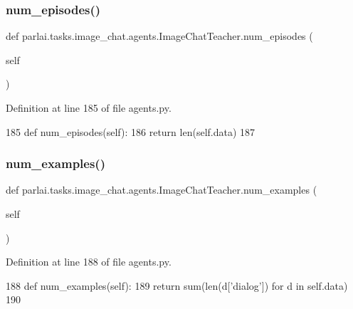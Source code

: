 \subsubsection{\texorpdfstring{num\+\_\+episodes()}{num\_episodes()}}
{\footnotesize\ttfamily def parlai.\+tasks.\+image\+\_\+chat.\+agents.\+Image\+Chat\+Teacher.\+num\+\_\+episodes (\begin{DoxyParamCaption}\item[{}]{self }\end{DoxyParamCaption})}



Definition at line 185 of file agents.\+py.


\begin{DoxyCode}
185     \textcolor{keyword}{def }num\_episodes(self):
186         \textcolor{keywordflow}{return} len(self.data)
187 
\end{DoxyCode}
\mbox{\label{classparlai_1_1tasks_1_1image__chat_1_1agents_1_1ImageChatTeacher_a79f6d03e7d21be3a61bad00252f8ea66}} 
\subsubsection{\texorpdfstring{num\+\_\+examples()}{num\_examples()}}
{\footnotesize\ttfamily def parlai.\+tasks.\+image\+\_\+chat.\+agents.\+Image\+Chat\+Teacher.\+num\+\_\+examples (\begin{DoxyParamCaption}\item[{}]{self }\end{DoxyParamCaption})}



Definition at line 188 of file agents.\+py.


\begin{DoxyCode}
188     \textcolor{keyword}{def }num\_examples(self):
189         \textcolor{keywordflow}{return} sum(len(d[\textcolor{stringliteral}{'dialog'}]) \textcolor{keywordflow}{for} d \textcolor{keywordflow}{in} self.data)
190 
\end{DoxyCode}
\mbox{\label{classparlai_1_1tasks_1_1image__chat_1_1agents_1_1ImageChatTeacher_aa91037220055d54a8d01877ae55a85f2}} 
